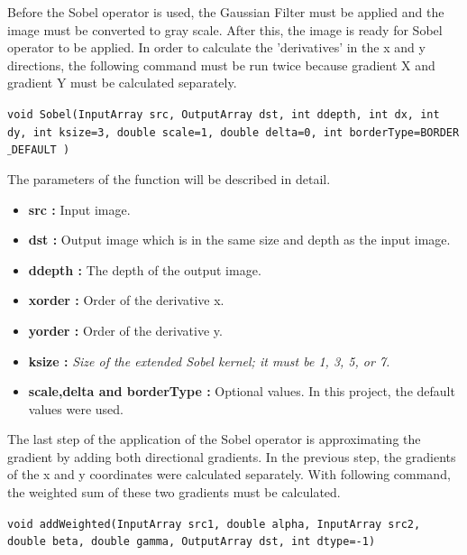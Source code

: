 Before the Sobel operator is used, the Gaussian Filter must be applied and the image must be converted to gray scale. After this, the image is ready for Sobel operator to be applied. In order to calculate the 'derivatives' in the x and y directions, the following command must be run twice because gradient X and gradient Y must be calculated separately.

 \begin{center}

\texttt{void Sobel(InputArray src, OutputArray dst, int ddepth, int dx, int dy, int ksize=3, double scale=1, double delta=0, int borderType=BORDER$\_$DEFAULT )}

 \end{center}
 
 The parameters of the function will be described in detail.
 
  \begin{itemize}

\item \textbf{src : }Input image.

\item \textbf{dst : }Output image which is in the same size and depth as the input image.

\item \textbf{ddepth : }The depth of the output image.

\item \textbf{xorder : }Order of the derivative x.

\item \textbf{yorder : }Order of the derivative y.

\item \textbf{ksize : }\emph{\color{green}Size of the extended Sobel kernel; it must be 1, 3, 5, or 7.}

\item \textbf{scale,delta and borderType : }Optional values. In this project, the default values were used.

  \end{itemize}

The last step of the application of the Sobel operator is approximating the gradient by adding both directional gradients. In the previous step, the gradients of the x and y coordinates were calculated separately. With following command, the weighted sum of these two gradients must be calculated.\cite{addWeighted}

 \begin{center}
 
\texttt{void addWeighted(InputArray src1, double alpha, InputArray src2, double beta, double gamma, OutputArray dst, int dtype=-1)}
 
  \end{center}
  

